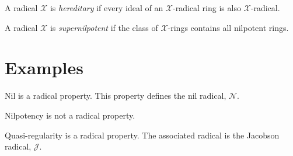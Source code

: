 \documentclass[12pt]{article}
\newcommand{\xrad}{\mathcal{X}}
\begin{document}
A radical $\xrad$ is \emph{hereditary} if every ideal of an $\xrad$-radical ring is also $\xrad$-radical.

A radical $\xrad$ is \emph{supernilpotent} if the class of $\xrad$-rings contains all nilpotent rings.

\section{Examples}

Nil is a radical property.  This property defines the nil radical, $\mathcal{N}$.

Nilpotency is not a radical property.

Quasi-regularity is a radical property.  The associated radical is the Jacobson radical, $\mathcal{J}$.
\end{document}
